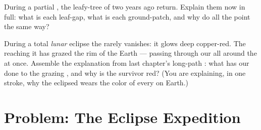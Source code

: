 \begin{exercise}[$\star\star$]\label{exo:g7:shadows-eclipses:11}
During a partial , the leafy-tree  of two
years ago return. Explain them now in full: what is each
leaf-gap, what is each ground-patch, and why do all the
 point the same way?
\end{exercise}

\begin{exercise}[$\star\star\star$]\label{exo:g7:shadows-eclipses:12}
During a total \emph{lunar} eclipse the  rarely vanishes: it
glows deep copper-red. The  reaching it has grazed the rim
of the Earth --- passing through our   all around the
 at once. Assemble the explanation from last chapter's
long-path : what has our  done to the
grazing , and why is the survivor  red? (You are
explaining, in one stroke, why the eclipsed  wears the color
of every  on Earth.)
\end{exercise}

\section{Problem: The Eclipse Expedition}

